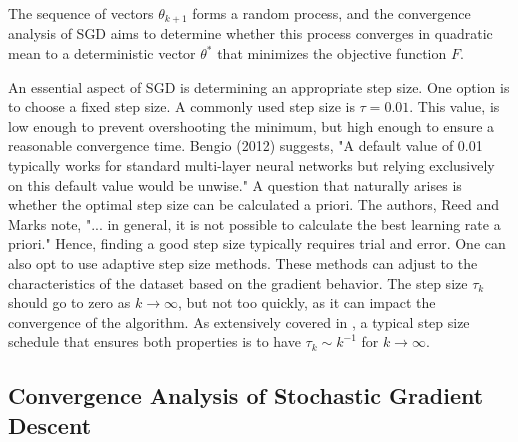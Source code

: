  The sequence of vectors $\theta_{k+1}$ forms a random process, and the convergence analysis of SGD aims to determine whether this process converges in quadratic mean to a deterministic vector $\theta^*$ that minimizes the objective function $F$.
\begin{comment}
Note that in the case of minimizing large sums, batch gradient descent has complexity $O(np),$ while a step of SGD only has complexity $O(p).$ SGD is thus advantageous when $n$ is very large, and one cannot afford to compute the full gradient.
\end{comment}
An essential aspect of SGD is determining an appropriate step size. One option is to choose a fixed step size. A commonly used step size is $\tau=0.01.$ This value, is low enough to prevent overshooting the minimum, but high enough to ensure a reasonable convergence time. Bengio (2012) suggests, "A default value of 0.01 typically works for standard multi-layer neural networks but relying exclusively on this default value would be unwise."\cite{bengio2012practical} A question that naturally arises is whether the optimal step size can be calculated a priori. The authors, Reed and Marks note, "... in general, it is not possible to calculate the best learning rate a priori."\cite{reed1999neural} Hence, finding a good step size typically requires trial and error. One can also opt to use adaptive step size methods. These methods can adjust to the characteristics of the dataset based on the gradient behavior. The step size $\tau_k$ should go to zero as $k \rightarrow \infty$, but not too quickly, as it can impact the convergence of the algorithm. As extensively covered in \cite[9-11]{murata}, a typical step size schedule that ensures both properties is to have $\tau_k \sim k^{-1}$ for $k \rightarrow \infty$. 

\newpage
\subsection{Convergence Analysis of Stochastic Gradient Descent}
